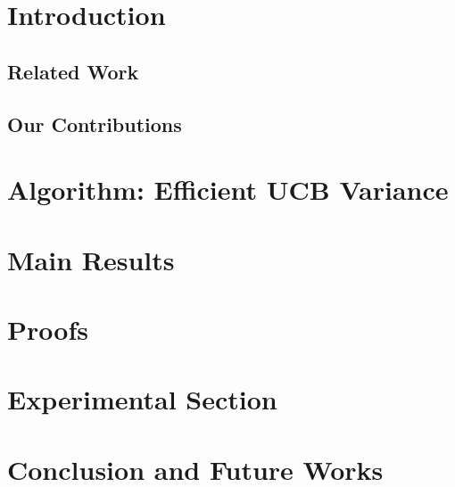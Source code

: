 \documentclass{llncs}
\begin{document}
\section{Introduction}
\label{sec:intro}


\subsection{Related Work}
\label{sec:related}



\subsection{Our Contributions}
\label{sec:contri}


\section{Algorithm: Efficient UCB Variance}
\label{sec:eucbv}


\section{Main Results} 
\label{sec:results}


\section{Proofs}
\label{sec:proofTheorem}


\section{Experimental Section}
\label{sec:expt}


\section{Conclusion and Future Works}
\label{sec:conc}



\clearpage
\newpage


%

%
\end{document}

